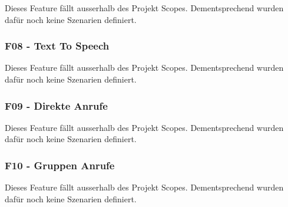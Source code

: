 Dieses Feature fällt ausserhalb des Projekt Scopes. Dementsprechend wurden dafür noch keine Szenarien definiert.

\subsubsection*{F08 - Text To Speech}
Dieses Feature fällt ausserhalb des Projekt Scopes. Dementsprechend wurden dafür noch keine Szenarien definiert.

\subsubsection*{F09 - Direkte Anrufe}
Dieses Feature fällt ausserhalb des Projekt Scopes. Dementsprechend wurden dafür noch keine Szenarien definiert.

\subsubsection*{F10 - Gruppen Anrufe}
Dieses Feature fällt ausserhalb des Projekt Scopes. Dementsprechend wurden dafür noch keine Szenarien definiert.

\clearpage
